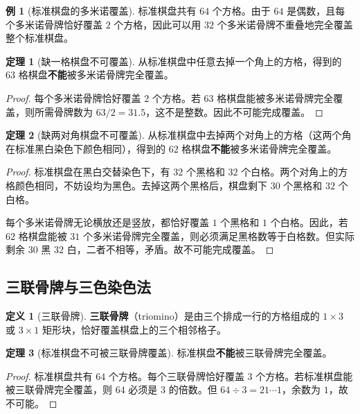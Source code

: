 \documentclass[UTF8,11pt,a4paper]{ctexbook}   %
\theoremstyle{definition}
\newtheorem{definition}{定义}[section]
\newtheorem{theorem}{定理}[section]
\newtheorem{example}{例}[section]
\begin{document}
\begin{example}[标准棋盘的多米诺覆盖]
标准棋盘共有 $64$ 个方格。由于 $64$ 是偶数，且每个多米诺骨牌恰好覆盖 $2$ 个方格，因此可以用 $32$ 个多米诺骨牌不重叠地完全覆盖整个标准棋盘。
\end{example}

\begin{theorem}[缺一格棋盘不可覆盖]
从标准棋盘中任意去掉一个角上的方格，得到的 $63$ 格棋盘\textbf{不能}被多米诺骨牌完全覆盖。
\end{theorem}

\begin{proof}
每个多米诺骨牌恰好覆盖 $2$ 个方格。若 $63$ 格棋盘能被多米诺骨牌完全覆盖，则所需骨牌数为 $63/2 = 31.5$，这不是整数。因此不可能完成覆盖。
\end{proof}

\begin{theorem}[缺两对角棋盘不可覆盖]
从标准棋盘中去掉两个对角上的方格（这两个角在标准黑白染色下颜色相同），得到的 $62$ 格棋盘\textbf{不能}被多米诺骨牌完全覆盖。
\end{theorem}

\begin{proof}
标准棋盘在黑白交替染色下，有 $32$ 个黑格和 $32$ 个白格。两个对角上的方格颜色相同，不妨设均为黑色。去掉这两个黑格后，棋盘剩下 $30$ 个黑格和 $32$ 个白格。

每个多米诺骨牌无论横放还是竖放，都恰好覆盖 $1$ 个黑格和 $1$ 个白格。因此，若 $62$ 格棋盘能被 $31$ 个多米诺骨牌完全覆盖，则必须满足黑格数等于白格数。但实际剩余 $30$ 黑 $32$ 白，二者不相等，矛盾。故不可能完成覆盖。
\end{proof}

\subsection{三联骨牌与三色染色法}

\begin{definition}[三联骨牌]
\textbf{三联骨牌}（triomino）是由三个排成一行的方格组成的 $1\times 3$ 或 $3\times 1$ 矩形块，恰好覆盖棋盘上的三个相邻格子。
\end{definition}

\begin{theorem}[标准棋盘不可被三联骨牌覆盖]
标准棋盘\textbf{不能}被三联骨牌完全覆盖。
\end{theorem}

\begin{proof}
标准棋盘共有 $64$ 个方格。每个三联骨牌恰好覆盖 $3$ 个方格。若标准棋盘能被三联骨牌完全覆盖，则 $64$ 必须是 $3$ 的倍数。但 $64 \div 3 = 21\cdots 1$，余数为 $1$，故不可能。
\end{proof}
\end{document}
